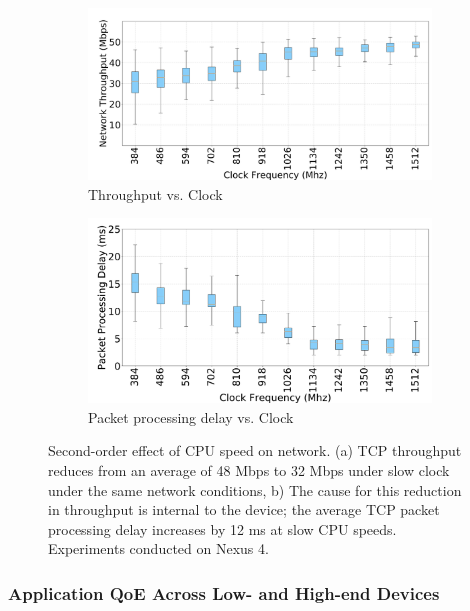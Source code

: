 \begin{figure} [t]
    \begin{subfigure}[b]{0.5\textwidth}
        \centering
        \includegraphics[height=0.5\textwidth,width=1\textwidth]{sections/device-work/Throughput}
        \caption{Throughput vs. Clock}
    \end{subfigure}
    \begin{subfigure}[b]{0.5\textwidth}
        \centering
        \includegraphics[height=0.5\textwidth,width=1\textwidth]{sections/device-work/ppd}
        \caption{Packet processing delay vs. Clock}
    \end{subfigure}%
     \caption{Second-order effect of CPU speed on network. (a) TCP throughput reduces from an average of 48 Mbps to 32 Mbps under slow clock under the same network conditions, b) The cause for this reduction in throughput is internal to the device; the average TCP packet processing delay increases by 12 ms at slow CPU speeds. Experiments conducted on Nexus 4.}
     \label{fig:tcp-perf}
     \vspace*{-1em}
\end{figure}


\subsubsection{Application QoE Across Low- and High-end Devices}

